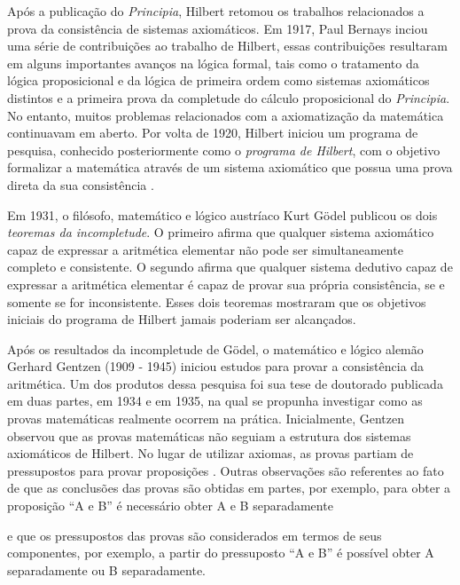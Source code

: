 Após a publicação do \textit{Principia}, Hilbert retomou os trabalhos relacionados a prova da consistência de sistemas axiomáticos. Em 1917, Paul Bernays inciou uma série de contribuições ao trabalho de Hilbert, essas contribuições resultaram em alguns importantes avanços na lógica formal, tais como o tratamento da lógica proposicional e da lógica de primeira ordem como sistemas axiomáticos distintos e a primeira prova da completude do cálculo proposicional do \textit{Principia}. No entanto, muitos problemas relacionados com a axiomatização da matemática continuavam em aberto. Por volta de 1920, Hilbert iniciou um programa de pesquisa, conhecido posteriormente como o \textit{programa de Hilbert}, com o objetivo formalizar a matemática através de um sistema axiomático que possua uma prova direta da sua consistência \cite{sep-hilbert-program}.

Em 1931, o filósofo, matemático e lógico austríaco Kurt G\"odel publicou os dois \textit{teoremas da incompletude}. O primeiro afirma que qualquer sistema axiomático capaz de expressar a aritmética elementar não pode ser simultaneamente completo e consistente. O segundo afirma que qualquer sistema dedutivo capaz de expressar a aritmética elementar é capaz de provar sua própria consistência, se e somente se for inconsistente. Esses dois teoremas mostraram que os objetivos iniciais do programa de Hilbert jamais poderiam ser alcançados.

Após os resultados da incompletude de G\"odel, o matemático e lógico alemão Gerhard Gentzen (1909 - 1945) iniciou estudos para provar a consistência da aritmética. Um dos produtos dessa pesquisa foi sua tese de doutorado publicada em duas partes, em 1934 e em 1935, na qual se propunha investigar como as provas matemáticas realmente ocorrem na prática. Inicialmente, Gentzen observou que as provas matemáticas não seguiam a estrutura dos sistemas axiomáticos de Hilbert. No lugar de utilizar axiomas, as provas partiam de pressupostos para provar proposições \cite{SEP-ProofTheory}. Outras observações são referentes ao fato de que as conclusões das provas são obtidas em partes, por exemplo, para obter a proposição  ``A e B'' é necessário obter A e B separadamente

\begin{prooftree}
\end{prooftree}

\noindent e que os pressupostos das provas são considerados em termos de seus componentes, por exemplo, a partir do pressuposto ``A e B'' é possível obter A separadamente ou B separadamente.

